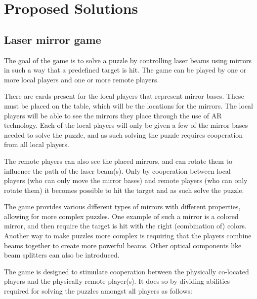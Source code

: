 \chapter{Proposed Solutions} \label{cha:solution}

\section{Laser mirror game}
	The goal of the game is to solve a puzzle by controlling laser beams
	using mirrors in such a way that a predefined target is hit. The game
	can be played by one or more local players and one or more remote players.

	There are cards present for the local players that represent mirror
	bases. These must be placed on the table, which will be the locations
	for the mirrors. The local players will be able to see the mirrors they
	place through the use of AR technology. Each of the local players will
	only be given a few of the mirror bases needed to solve the puzzle, and
	as such solving the puzzle requires cooperation from all local players.

	The remote players can also see the placed mirrors, and can rotate them
	to influence the path of the laser beam(s). Only by cooperation between
	local players (who can only move the mirror bases) and remote players
	(who can only rotate them) it becomes possible to hit the target and as
	such solve the puzzle.

	The game provides various different types of mirrors with different
	properties, allowing for more complex puzzles. One example of such a
	mirror is a colored mirror, and then require the target is hit with the
	right (combination of) colors. Another way to make puzzles more complex
	is requiring that the players combine beams together to create more
	powerful beams. Other optical components like beam splitters can also be introduced.

	The game is designed to stimulate cooperation between the physically
	co-located players and the physically remote player(s). It does so by
	dividing abilities required for solving the puzzles amongst all players
	as follows:

